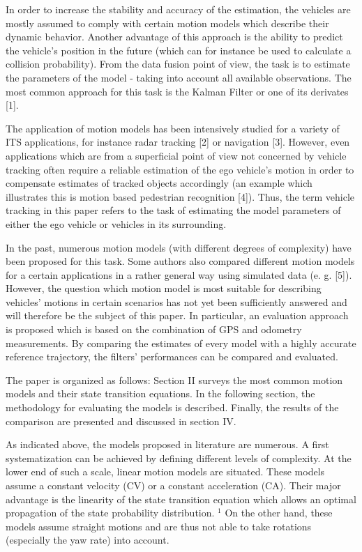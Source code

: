 In order to increase the stability and accuracy of the estimation, the vehicles are mostly assumed to comply with certain motion models which describe their dynamic behavior. Another advantage of this approach is the ability to predict the vehicle's position in the future (which can for instance be used to calculate a collision probability). From the data fusion point of view, the task is to estimate the parameters of the model - taking into account all available observations. The most common approach for this task is the Kalman Filter or one of its derivates [1].

The application of motion models has been intensively studied for a variety of ITS applications, for instance radar tracking [2] or navigation [3]. However, even applications which are from a superficial point of view not concerned by vehicle tracking often require a reliable estimation of the ego vehicle's motion in order to compensate estimates of tracked objects accordingly (an example which illustrates this is motion based pedestrian recognition [4]). Thus, the term vehicle tracking in this paper refers to the task of estimating the model parameters of either the ego vehicle or vehicles in its surrounding.

In the past, numerous motion models (with different degrees of complexity) have been proposed for this task. Some authors also compared different motion models for a certain applications in a rather general way using simulated data (e. g. [5]). However, the question which motion model is most suitable for describing vehicles' motions in certain scenarios has not yet been sufficiently answered and will therefore be the subject of this paper. In particular, an evaluation approach is proposed which is based on the combination of GPS and odometry measurements. By comparing the estimates of every model with a highly accurate reference trajectory, the filters' performances can be compared and evaluated.

The paper is organized as follows: Section II surveys the most common motion models and their state transition equations. In the following section, the methodology for evaluating the models is described. Finally, the results of the comparison are presented and discussed in section IV.

As indicated above, the models proposed in literature are numerous. A first systematization can be achieved by defining different levels of complexity. At the lower end of such a scale, linear motion models are situated. These models assume a constant velocity (CV) or a constant acceleration (CA). Their major advantage is the linearity of the state transition equation which allows an optimal propagation of the state probability distribution. ${ }^{1}$ On the other hand, these models assume straight motions and are thus not able to take rotations (especially the yaw rate) into account.

